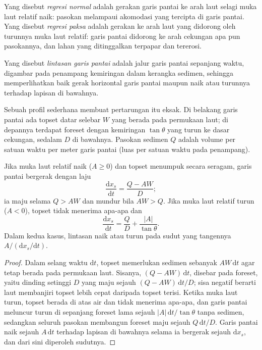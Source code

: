 \begin{definition}\label{def:b3:sequence-stratigraphy:regression}
Yang disebut \emph{regresi normal} adalah gerakan garis pantai
ke arah laut selagi muka laut relatif naik: pasokan melampaui akomodasi yang
tercipta di garis pantai. Yang disebut \emph{regresi paksa}
adalah gerakan ke arah laut yang didorong oleh turunnya muka laut relatif:
garis pantai didorong ke arah cekungan apa pun pasokannya, dan lahan yang
ditinggalkan terpapar dan tererosi.
\end{definition}

\begin{definition}\label{def:b3:sequence-stratigraphy:trajectory}
Yang disebut \emph{lintasan garis pantai} adalah jalur
garis pantai sepanjang waktu, digambar pada penampang kemiringan dalam kerangka
sedimen, sehingga memperlihatkan baik gerak horizontal garis pantai maupun
naik atau turunnya terhadap lapisan di bawahnya.
\end{definition}

Sebuah profil sederhana membuat pertarungan itu eksak. Di belakang garis pantai ada topset datar
selebar $W$ yang berada pada permukaan laut; di depannya terdapat foreset dengan kemiringan
$\tan\theta$ yang turun ke dasar cekungan, sedalam $D$ di bawahnya. Pasokan sedimen
$Q$ adalah volume per satuan waktu per meter garis pantai (luas per satuan waktu
pada penampang).

\begin{proposition}\label{prop:b3:sequence-stratigraphy:trajectory}
Jika muka laut relatif naik ($A \ge 0$) dan topset menumpuk secara seragam,
garis pantai bergerak dengan laju
\[
\frac{\mathrm dx_s}{\mathrm dt} = \frac{Q - AW}{D};
\]
ia maju selama $Q > AW$ dan mundur bila $AW > Q$. Jika muka laut relatif
turun ($A < 0$), topset tidak menerima apa-apa dan
\[
\frac{\mathrm dx_s}{\mathrm dt} = \frac{Q}{D} + \frac{|A|}{\tan\theta}.
\]
Dalam kedua kasus, lintasan naik atau turun pada sudut yang tangennya
$A/(\mathrm dx_s/\mathrm dt)$.
\end{proposition}

\begin{proof}
Dalam selang waktu $\mathrm dt$, topset memerlukan sedimen sebanyak $AW\,\mathrm dt$
agar tetap berada pada permukaan laut. Sisanya, $(Q - AW)\,\mathrm dt$, disebar pada foreset,
yaitu dinding setinggi $D$ yang maju sejauh $(Q - AW)\,\mathrm dt/D$; sisa negatif
berarti laut membanjiri topset lebih cepat daripada topset terisi. Ketika muka laut
turun, topset berada di atas air dan tidak menerima apa-apa, dan garis pantai
meluncur turun di sepanjang foreset lama sejauh $|A|\,\mathrm dt/\tan\theta$ tanpa
sedimen, sedangkan seluruh pasokan membangun foreset maju sejauh $Q\,\mathrm
dt/D$. Garis pantai naik sejauh $A\,\mathrm dt$ terhadap lapisan di bawahnya
selama ia bergerak sejauh $\mathrm dx_s$, dan dari sini diperoleh sudutnya.
\end{proof}

